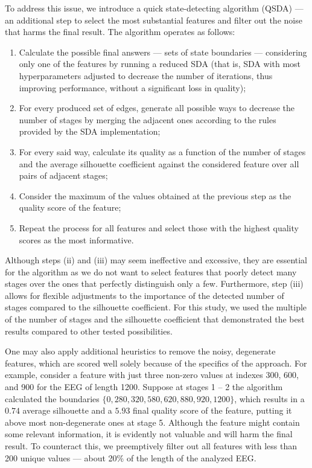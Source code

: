 \documentclass[10pt]{iopart}
\begin{document}
To address this issue, we introduce a quick state-detecting algorithm (QSDA) --- an additional step to select the most substantial features and filter out the noise that harms the final result. The algorithm operates as follows:
\begin{enumerate}
    \item 
        Calculate the possible final answers --- sets of state boundaries --- considering only one of the features by running a reduced SDA (that is, SDA with most hyperparameters adjusted to decrease the number of iterations, thus improving performance, without a significant loss in quality);
    \item
        For every produced set of edges, generate all possible ways to decrease the number of stages by merging the adjacent ones according to the rules provided by the SDA implementation;
    \item
        For every said way, calculate its quality as a function of the number of stages and the average silhouette coefficient against the considered feature over all pairs of adjacent stages;
    \item 
        Consider the maximum of the values obtained at the previous step as the quality score of the feature;
    \item
        Repeat the process for all features and select those with the highest quality scores as the most informative.
\end{enumerate}

Although steps (ii) and (iii) may seem ineffective and excessive, they are essential for the algorithm as we do not want to select features that poorly detect many stages over the ones that perfectly distinguish only a few. Furthermore, step (iii) allows for flexible adjustments to the importance of the detected number of stages compared to the silhouette coefficient. For this study, we used the multiple of the number of stages and the silhouette coefficient that demonstrated the best results compared to other tested possibilities.

One may also apply additional heuristics to remove the noisy, degenerate features, which are scored well solely because of the specifics of the approach. For example, consider a feature with just three non-zero values at indexes 300, 600, and 900 for the EEG of length 1200. Suppose at stages 1 -- 2 the algorithm calculated the boundaries $\{ 0, 280, 320, 580, 620, 880, 920, 1200 \}$, which results in a $0.74$ average silhouette and a $5.93$ final quality score of the feature, putting it above most non-degenerate ones at stage 5. Although the feature might contain some relevant information, it is evidently not valuable and will harm the final result. To counteract this, we preemptively filter out all features with less than 200 unique values --- about 20\% of the length of the analyzed EEG.\@
\end{document}
